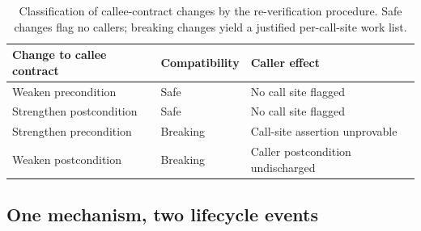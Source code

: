 \begin{table}[t]
  \centering
  \caption{Classification of callee-contract changes by the re-verification procedure. Safe changes flag no callers; breaking changes yield a justified per-call-site work list.}
  \label{tab:a5-propagation}
  \begin{tabular}{@{}lll@{}}
    \toprule
    Change to callee contract & Compatibility & Caller effect \\
    \midrule
    Weaken precondition       & Safe     & No call site flagged \\
    Strengthen postcondition  & Safe     & No call site flagged \\
    Strengthen precondition   & Breaking & Call-site assertion unprovable \\
    Weaken postcondition      & Breaking & Caller postcondition undischarged \\
    \bottomrule
  \end{tabular}
\end{table}

\subsection{One mechanism, two lifecycle events}\label{subsec:a5-onemech}

